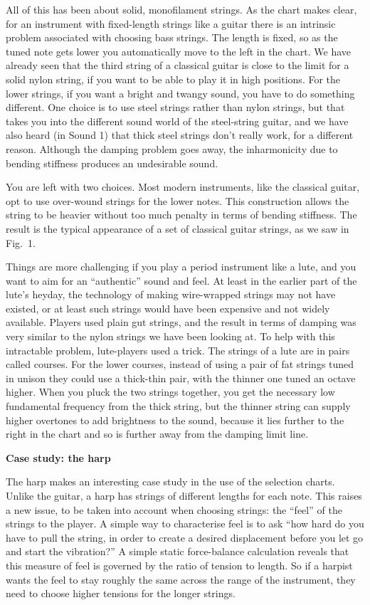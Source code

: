   All of this has been about solid, monofilament strings. As the chart makes 
  clear, for an instrument with fixed-length strings like a guitar there is an 
  intrinsic problem associated with choosing bass strings. The length is fixed, 
  so as the tuned note gets lower you automatically move to the left in the 
  chart. We have already seen that the third string of a classical guitar is 
  close to the limit for a solid nylon string, if you want to be able to play 
  it in high positions. For the lower strings, if you want a bright and twangy 
  sound, you have to do something different. One choice is to use steel strings 
  rather than nylon strings, but that takes you into the different sound world 
  of the steel-string guitar, and we have also heard (in Sound 1) that thick 
  steel strings don't really work, for a different reason. Although the damping 
  problem goes away, the inharmonicity due to bending stiffness produces an 
  undesirable sound. 

  You are left with two choices. Most modern instruments, like the classical 
  guitar, opt to use over-wound strings for the lower notes. This construction 
  allows the string to be heavier without too much penalty in terms of bending 
  stiffness. The result is the typical appearance of a set of classical guitar 
  strings, as we saw in Fig.\ 1. 

  Things are more challenging if you play a period instrument like a lute, and 
  you want to aim for an ``authentic'' sound and feel. At least in the earlier 
  part of the lute's heyday, the technology of making wire-wrapped strings may 
  not have existed, or at least such strings would have been expensive and not 
  widely available. Players used plain gut strings, and the result in terms of 
  damping was very similar to the nylon strings we have been looking at. To 
  help with this intractable problem, lute-players used a trick. The strings of 
  a lute are in pairs called courses. For the lower courses, instead of using a 
  pair of fat strings tuned in unison they could use a thick-thin pair, with 
  the thinner one tuned an octave higher. When you pluck the two strings 
  together, you get the necessary low fundamental frequency from the thick 
  string, but the thinner string can supply higher overtones to add brightness 
  to the sound, because it lies further to the right in the chart and so is 
  further away from the damping limit line. 

  \textbf{Case study: the harp} 

  The harp makes an interesting case study in the use of the selection charts. 
  Unlike the guitar, a harp has strings of different lengths for each note. 
  This raises a new issue, to be taken into account when choosing strings: the 
  ``feel'' of the strings to the player. A simple way to characterise feel is 
  to ask ``how hard do you have to pull the string, in order to create a 
  desired displacement before you let go and start the vibration?'' A simple 
  static force-balance calculation reveals that this measure of feel is 
  governed by the ratio of tension to length. So if a harpist wants the feel to 
  stay roughly the same across the range of the instrument, they need to choose 
  higher tensions for the longer strings. 

